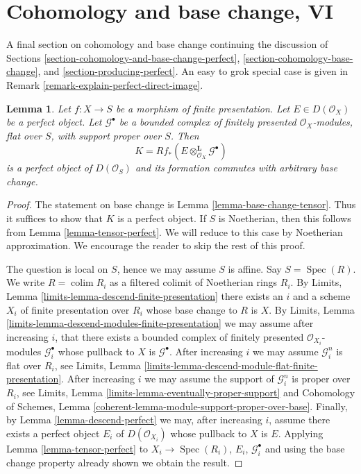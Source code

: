 \documentclass{stacks-project}
\theoremstyle{plain}
\newtheorem{lemma}[subsection]{Lemma}
\theoremstyle{definition}
\theoremstyle{remark}
\numberwithin{equation}{subsection}
\def\colim{\mathop{\mathrm{colim}}\nolimits}
\def\Spec{\mathop{\mathrm{Spec}}}
\begin{document}
\section{Cohomology and base change, VI}
\label{section-cohomology-and-base-change-final}

\noindent
A final section on cohomology and base change continuing
the discussion of Sections
\ref{section-cohomology-and-base-change-perfect},
\ref{section-cohomology-base-change}, and
\ref{section-producing-perfect}.
An easy to grok special case is given in
Remark \ref{remark-explain-perfect-direct-image}.

\begin{lemma}
\label{lemma-base-change-tensor-perfect}
Let $f : X \to S$ be a morphism of finite presentation.
Let $E \in D(\mathcal{O}_X)$ be a perfect object. Let $\mathcal{G}^\bullet$
be a bounded complex of finitely presented $\mathcal{O}_X$-modules,
flat over $S$, with support proper over $S$. Then
$$
K = Rf_*(E \otimes_{\mathcal{O}_X}^\mathbf{L} \mathcal{G}^\bullet)
$$
is a perfect object of $D(\mathcal{O}_S)$ and its formation
commutes with arbitrary base change.
\end{lemma}

\begin{proof}
The statement on base change is Lemma \ref{lemma-base-change-tensor}.
Thus it suffices to show that $K$ is a perfect object. If $S$ is
Noetherian, then this follows from
Lemma \ref{lemma-tensor-perfect}.
We will reduce to this case by Noetherian approximation.
We encourage the reader to skip the rest of this proof.

\medskip\noindent
The question is local on $S$, hence we may assume $S$ is affine.
Say $S = \Spec(R)$. We write $R = \colim R_i$ as a filtered colimit
of Noetherian rings $R_i$. By Limits, Lemma
\ref{limits-lemma-descend-finite-presentation}
there exists an $i$ and a scheme $X_i$ of finite presentation over $R_i$
whose base change to $R$ is $X$. By
Limits, Lemma \ref{limits-lemma-descend-modules-finite-presentation}
we may assume after increasing $i$, that there exists a bounded
complex of finitely presented $\mathcal{O}_{X_i}$-modules
$\mathcal{G}_i^\bullet$ whose pullback to $X$ is $\mathcal{G}^\bullet$.
After increasing $i$ we may assume $\mathcal{G}_i^n$ is flat over $R_i$, see
Limits, Lemma \ref{limits-lemma-descend-module-flat-finite-presentation}.
After increasing $i$ we may assume the support of $\mathcal{G}_i^n$
is proper over $R_i$, see
Limits, Lemma \ref{limits-lemma-eventually-proper-support}
and Cohomology of Schemes, Lemma
\ref{coherent-lemma-module-support-proper-over-base}.
Finally, by Lemma \ref{lemma-descend-perfect}
we may, after increasing $i$, assume there exists a perfect
object $E_i$ of $D(\mathcal{O}_{X_i})$ whose pullback to
$X$ is $E$. Applying Lemma \ref{lemma-tensor-perfect}
to $X_i \to \Spec(R_i)$, $E_i$, $\mathcal{G}_i^\bullet$ and using the
base change property already shown we obtain the result.
\end{proof}
\end{document}

